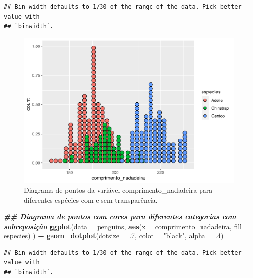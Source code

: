 \documentclass[
]{article}
\newenvironment{Shaded}{\begin{snugshade}}{\end{snugshade}}
\newcommand{\AttributeTok}[1]{\textcolor[rgb]{0.13,0.29,0.53}{#1}}
\newcommand{\DecValTok}[1]{\textcolor[rgb]{0.00,0.00,0.81}{#1}}
\newcommand{\DocumentationTok}[1]{\textcolor[rgb]{0.56,0.35,0.01}{\textbf{\textit{#1}}}}
\newcommand{\FunctionTok}[1]{\textcolor[rgb]{0.13,0.29,0.53}{\textbf{#1}}}
\newcommand{\NormalTok}[1]{#1}
\newcommand{\SpecialCharTok}[1]{\textcolor[rgb]{0.81,0.36,0.00}{\textbf{#1}}}
\newcommand{\StringTok}[1]{\textcolor[rgb]{0.31,0.60,0.02}{#1}}
\begin{document}
\begin{verbatim}
## Bin width defaults to 1/30 of the range of the data. Pick better value with
## `binwidth`.
\end{verbatim}

\begin{figure}
\includegraphics[width=0.75\linewidth,height=0.75\textheight]{epr_files/figure-latex/fig-dot-flipper-cat-1} \caption{Diagrama de pontos da variável comprimento_nadadeira para diferentes espécies com e sem transparência.}\label{fig:fig-dot-flipper-cat-1}
\end{figure}

\begin{Shaded}
\begin{Highlighting}[]
\DocumentationTok{\#\# Diagrama de pontos com cores para diferentes categorias com sobreposição}
\FunctionTok{ggplot}\NormalTok{(}\AttributeTok{data =}\NormalTok{ penguins, }
       \FunctionTok{aes}\NormalTok{(}\AttributeTok{x =}\NormalTok{ comprimento\_nadadeira, }\AttributeTok{fill =}\NormalTok{ especies)}
\NormalTok{       ) }\SpecialCharTok{+}
    \FunctionTok{geom\_dotplot}\NormalTok{(}\AttributeTok{dotsize =}\NormalTok{ .}\DecValTok{7}\NormalTok{, }\AttributeTok{color =} \StringTok{"black"}\NormalTok{, }\AttributeTok{alpha =}\NormalTok{ .}\DecValTok{4}\NormalTok{)}
\end{Highlighting}
\end{Shaded}

\begin{verbatim}
## Bin width defaults to 1/30 of the range of the data. Pick better value with
## `binwidth`.
\end{verbatim}
\end{document}
